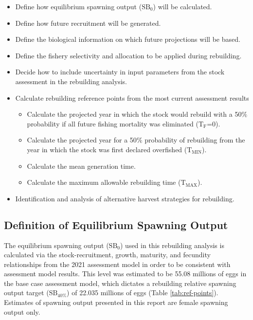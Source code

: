 \documentclass[11pt,
  english,
  a4paper,
]{article}
\begin{document}
\begin{itemize}
    \item Define how equilibrium spawning output ($\text{SB}_0$) will be calculated. 
    \item Define how future recruitment will be generated.
    \item Define the biological information on which future projections will be based.
    \item Define the fishery selectivity and allocation to be applied during rebuilding. 
    \item Decide how to include uncertainty in input parameters from the stock assessment in the rebuilding analysis. 
    \item Calculate rebuilding reference points from the most current assessment results 
    \begin{itemize}
        \item Calculate the projected year in which the stock would rebuild with a 50$\%$ probability if all future fishing mortality was eliminated ($\text{T}_\text{F}$=0).
        \item  Calculate the projected year for a 50$\%$ probability of rebuilding from the year in which the stock was first declared overfished ($\text{T}_\text{MIN}$). 
        \item Calculate the mean generation time. 
        \item Calculate the maximum allowable rebuilding time ($\text{T}_\text{MAX}$). 
    \end{itemize}
    \item Identification and analysis of alternative harvest strategies for rebuilding. 
\end{itemize}


\hypertarget{definition-of-equilibrium-spawning-output}{%
\subsection{Definition of Equilibrium Spawning Output}\label{definition-of-equilibrium-spawning-output}}

\leavevmode\tagmcend\tagstructend


The equilibrium spawning output ({\(\text{SB}_0\)\leavevmode\tagmcend\tagstructend}) used in this rebuilding analysis is calculated via the stock-recruitment, growth, maturity, and fecundity relationships from the 2021 assessment model in order to be consistent with assessment model results. This level was estimated to be 55.08 millions of eggs in the base case assessment model, which dictates a rebuilding relative spawning output target ({\(\text{SB}_{40\%}\)\leavevmode\tagmcend\tagstructend}) of 22.035 millions of eggs (Table \ref{tab:ref-points}). Estimates of spawning output presented in this report are female spawning output only.
\end{document}
